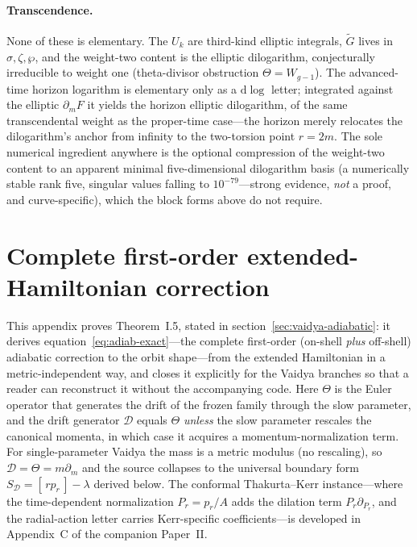 \documentclass[12pt]{iopart}
\newcommand{\dd}{\mathrm{d}}
\begin{document}
\paragraph{Transcendence.}
None of these is elementary. The $U_k$ are third-kind elliptic integrals, $\tilde G$
lives in $\sigma,\zeta,\wp$, and the weight-two content is the elliptic dilogarithm,
conjecturally irreducible to weight one (theta-divisor obstruction $\Theta=W_{g-1}$). The
advanced-time horizon logarithm is elementary only as a $\dd\log$ letter; integrated
against the elliptic $\partial_m F$ it yields the horizon elliptic dilogarithm, of the
same transcendental weight as the proper-time case---the horizon merely relocates the
dilogarithm's anchor from infinity to the two-torsion point $r=2m$. The sole
numerical ingredient anywhere is the optional compression of the weight-two content to
an apparent minimal five-dimensional dilogarithm basis (a numerically stable rank five,
singular values falling to $10^{-79}$---strong evidence, \emph{not} a proof, and
curve-specific), which the block forms above do not require.

\FloatBarrier


\section{Complete first-order extended-Hamiltonian correction}
\label{app:firstorder}

This appendix proves Theorem~I.5, stated in section~\ref{sec:vaidya-adiabatic}: it derives
equation~\eqref{eq:adiab-exact}---the complete first-order (on-shell \emph{plus} off-shell)
adiabatic correction to the orbit shape---from the extended Hamiltonian in a
metric-independent way, and closes it explicitly for the Vaidya branches so that a reader
can reconstruct it without the accompanying code. Here $\Theta$ is the Euler operator that
generates the drift of the frozen family through the slow parameter, and the drift
generator $\mathcal D$ equals $\Theta$ \emph{unless} the slow parameter rescales the
canonical momenta, in which case it acquires a momentum-normalization term. For
single-parameter Vaidya the mass is a metric modulus (no rescaling), so
$\mathcal D=\Theta=m\partial_m$ and the source collapses to the universal boundary form
$S_{\mathcal D}=[\,rp_r\,]-\lambda$ derived below. The conformal Thakurta--Kerr
instance---where the time-dependent normalization $P_r=p_r/A$ adds the dilation term
$P_r\partial_{P_r}$, and the radial-action letter carries Kerr-specific
coefficients---is developed in Appendix~C of the companion Paper~II.
\end{document}
